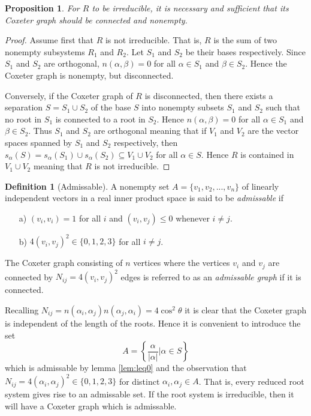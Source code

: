 \documentclass[twoside,utf8]{article}
\theoremstyle{plain}
\newtheorem{proposition}{Proposition}
\theoremstyle{definition}
\newtheorem{definition}{Definition}
\theoremstyle{remark}
\begin{document}
\begin{proposition}
For $R$ to be irreducible, it is necessary and sufficient that its Coxeter graph should be connected and nonempty.
\end{proposition}
\begin{proof}
Assume first that $R$ is not irreducible. That is, $R$ is the sum of two nonempty subsystems $R_1$ and $R_2$. Let $S_1$ and $S_2$ be their bases respectively. Since $S_1$ and $S_2$ are orthogonal, $n(\alpha,\beta)=0$ for all $\alpha \in S_1$ and $\beta \in S_2$. Hence the Coxeter graph is nonempty, but disconnected. 

Conversely, if the Coxeter graph of $R$ is disconnected, then there exists a separation $S=S_1\cup S_2$ of the base $S$ into nonempty subsets $S_1$ and $S_2$ such that no root in $S_1$ is connected to a root in $S_2$. Hence $n(\alpha,\beta)=0$ for all $\alpha \in S_1$ and $\beta \in S_2$. Thus $S_1$ and $S_2$ are orthogonal meaning that if $V_1$ and $V_2$ are the vector spaces spanned by $S_1$ and $S_2$ respectively, then $s_\alpha(S) = s_\alpha(S_1) \cup s_\alpha (S_2) \subseteq V_1 \cup V_2$ for all $\alpha \in S$. Hence $R$ is contained in $V_1 \cup V_2$ meaning that $R$ is not irreducible.
\end{proof}

\begin{definition}[Admissable]
A nonempty set $A=\{v_1,v_2,...,v_n\}$ of linearly independent vectors in a real inner product space is said to be \textit{admissable} if
\begin{itemize}
\item[a)] $(v_i,v_i)=1$ for all $i$ and $(v_i,v_j)\leq 0$ whenever $i\neq j$.
\item[b)] $4(v_i,v_j)^2\in \{0,1,2,3\}$ for all $i\neq j$.
\end{itemize}
The Coxeter graph consisting of $n$ vertices where the vertices $v_i$ and $v_j$ are connected by $N_{ij}=4(v_i,v_j)^2$ edges is referred to as an \textit{admissable graph} if it is connected.
\end{definition}

\noindent
Recalling $N_{ij}=n(\alpha_i,\alpha_j)n(\alpha_j,\alpha_i)=4\cos^2 \theta$ it is clear that the Coxeter graph is independent of the length of the roots. Hence it is convenient to introduce the set
\[
A=\left\{\frac{\alpha}{|\alpha|}\big| \alpha \in S \right\}
\]
which is admissable by lemma \ref*{lem:leq0} and the observation that $N_{ij}=4(\alpha_i,\alpha_j)^2\in\{0,1,2,3\}$ for distinct $\alpha_i,\alpha_j \in A$. That is, every reduced root system gives rise to an admissable set. If the root system is irreducible, then it will have a Coxeter graph which is admissable.
\end{document}
